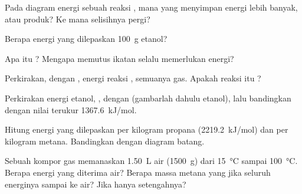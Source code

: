\begin{exercise}[$\star$]\label{exo:g11:reaction-energy:3}
Pada diagram energi sebuah reaksi , mana yang menyimpan energi
lebih banyak,  atau produk? Ke mana selisihnya pergi?
\end{exercise}

\begin{exercise}[$\star$]\label{exo:g11:reaction-energy:4}
Berapa energi yang dilepaskan  \qty{100}{g} etanol?
\end{exercise}

\begin{exercise}[$\star$]\label{exo:g11:reaction-energy:5}
Apa itu ? Mengapa memutus ikatan selalu memerlukan energi?
\end{exercise}

\begin{exercise}[$\star\star$]\label{exo:g11:reaction-energy:6}
Perkirakan, dengan , energi reaksi
, semuanya gas. Apakah reaksi itu ?
\end{exercise}

\begin{exercise}[$\star\star$]\label{exo:g11:reaction-energy:7}
Perkirakan energi  etanol, , dengan  (gambarlah dahulu 
etanol), lalu bandingkan dengan nilai terukur \qty{1367.6}{kJ/mol}.
\end{exercise}

\begin{exercise}[$\star\star$]\label{exo:g11:reaction-energy:8}
Hitung energi yang dilepaskan per kilogram propana
(\qty{2219.2}{kJ/mol}) dan per kilogram metana. Bandingkan dengan
diagram batang.
\end{exercise}

\begin{exercise}[$\star\star$]\label{exo:g11:reaction-energy:9}
Sebuah kompor gas memanaskan \qty{1.50}{L} air (\qty{1500}{g}) dari
\qty{15}{\celsius} sampai \qty{100}{\celsius}. Berapa energi yang
diterima air? Berapa massa metana yang  jika seluruh energinya
sampai ke air? Jika hanya setengahnya?
\end{exercise}

